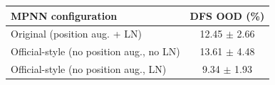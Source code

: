 \begin{tabular}{lc}
\toprule
MPNN configuration & DFS OOD (\%) \\
\midrule
Original (position aug. + LN) & 12.45 $\pm$ 2.66 \\
Official-style (no position aug., no LN) & 13.61 $\pm$ 4.48 \\
Official-style (no position aug., LN) & 9.34 $\pm$ 1.93 \\
\bottomrule
\end{tabular}
